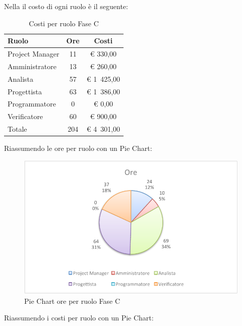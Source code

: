 				Nella  il costo di ogni ruolo è il seguente:
				\begin{table}[H]
					\begin{center}
						\begin{tabular}{| l | c | c |}
							\hline
							Ruolo 				& Ore 	& Costi  \\ \hline
							
							Project Manager		& 11 		& \euro{} 330,00 	\\
							Amministratore 		& 13 		& \euro{} 260,00 	\\
							Analista	 		& 57 		& \euro{} 1~425,00 	\\
							Progettista 		& 63 		& \euro{} 1~386,00  	\\
							Programmatore		& 0			& \euro{} 0,00	\\
							Verificatore		& 60 		& \euro{} 900,00 	\\ \hline \hline
								
							Totale	 			& 204 		& \euro{} 4~301,00 	\\ \hline
						\end{tabular}
					\end{center}
					\caption{Costi per ruolo Fase C}
				\end{table}
				Riassumendo le ore per ruolo con un Pie Chart:
				\begin{figure}[H]\centering
					\includegraphics[width=\textwidth]{PianoDiProgetto/Pics/ChartTotOreFaseC.pdf}
					\caption{Pie Chart ore per ruolo Fase C}
				\end{figure}
				Riassumendo i costi per ruolo con un Pie Chart:

